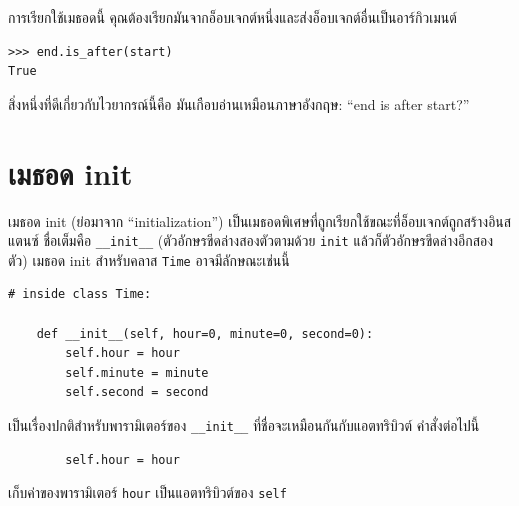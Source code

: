 การเรียกใช้เมธอดนี้ คุณต้องเรียกมันจากอ็อบเจกต์หนึ่งและส่งอ็อบเจกต์อื่นเป็นอาร์กิวเมนต์

\begin{verbatim}
>>> end.is_after(start)
True
\end{verbatim}
%

สิ่งหนึ่งที่ดีเกี่ยวกับไวยากรณ์นี้คือ มันเกือบอ่านเหมือนภาษาอังกฤษ: ``end is after start?''


\section{เมธอด init} %


เมธอด init (ย่อมาจาก ``initialization'') เป็นเมธอดพิเศษที่ถูกเรียกใช้ขณะที่อ็อบเจกต์ถูกสร้างอินสแตนซ์ 
ชื่อเต็มคือ \verb"__init__" (ตัวอักษรขีดล่างสองตัวตามด้วย {\tt init} แล้วก็ตัวอักษรขีดล่างอีกสองตัว)  เมธอด init สำหรับคลาส {\tt Time} อาจมีลักษณะเช่นนี้

\begin{verbatim}
# inside class Time:

    def __init__(self, hour=0, minute=0, second=0):
        self.hour = hour
        self.minute = minute
        self.second = second
\end{verbatim}
%

เป็นเรื่องปกติสำหรับพารามิเตอร์ของ \verb"__init__" ที่ชื่อจะเหมือนกันกับแอตทริบิวต์ คำสั่งต่อไปนี้

\begin{verbatim}
        self.hour = hour
\end{verbatim}
%

เก็บค่าของพารามิเตอร์ {\tt hour} เป็นแอตทริบิวต์ของ \texttt{self} 


